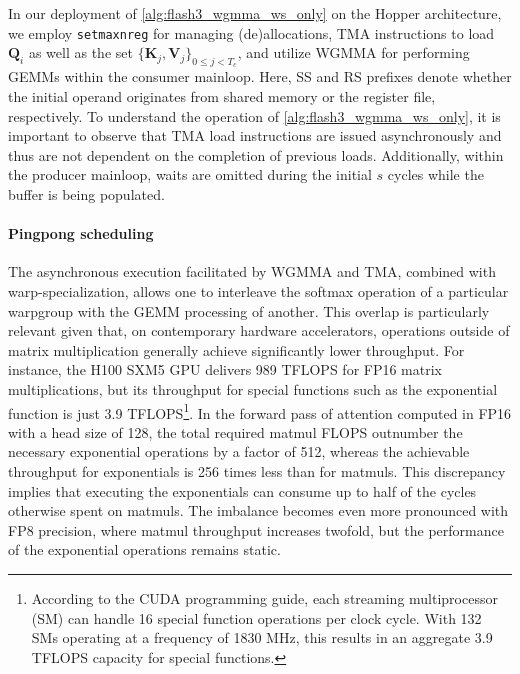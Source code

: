 In our deployment of \cref{alg:flash3_wgmma_ws_only} on the Hopper architecture, we employ \verb|setmaxnreg| for managing (de)allocations, TMA instructions to load $\mathbf{Q}_i$ as well as the set $\{ \mathbf{K}_j, \mathbf{V}_j \}_{0 \leq j < T_c}$, and utilize WGMMA for performing GEMMs within the consumer mainloop. Here, SS and RS prefixes denote whether the initial operand originates from shared memory or the register file, respectively. To understand the operation of \cref{alg:flash3_wgmma_ws_only}, it is important to observe that TMA load instructions are issued asynchronously and thus are not dependent on the completion of previous loads. Additionally, within the producer mainloop, waits are omitted during the initial $s$ cycles while the buffer is being populated.

\paragraph{Pingpong scheduling} The asynchronous execution facilitated by WGMMA and TMA, combined with warp-specialization, allows one to interleave the softmax operation of a particular warpgroup with the GEMM processing of another. This overlap is particularly relevant given that, on contemporary hardware accelerators, operations outside of matrix multiplication generally achieve significantly lower throughput. For instance, the H100 SXM5 GPU delivers 989 TFLOPS for FP16 matrix multiplications, but its throughput for special functions such as the exponential function is just 3.9 TFLOPS\footnote{According to the CUDA programming guide, each streaming multiprocessor (SM) can handle 16 special function operations per clock cycle. With 132 SMs operating at a frequency of 1830 MHz, this results in an aggregate 3.9 TFLOPS capacity for special functions.}. In the forward pass of attention computed in FP16 with a head size of 128, the total required matmul FLOPS outnumber the necessary exponential operations by a factor of 512, whereas the achievable throughput for exponentials is 256 times less than for matmuls. This discrepancy implies that executing the exponentials can consume up to half of the cycles otherwise spent on matmuls. The imbalance becomes even more pronounced with FP8 precision, where matmul throughput increases twofold, but the performance of the exponential operations remains static.

